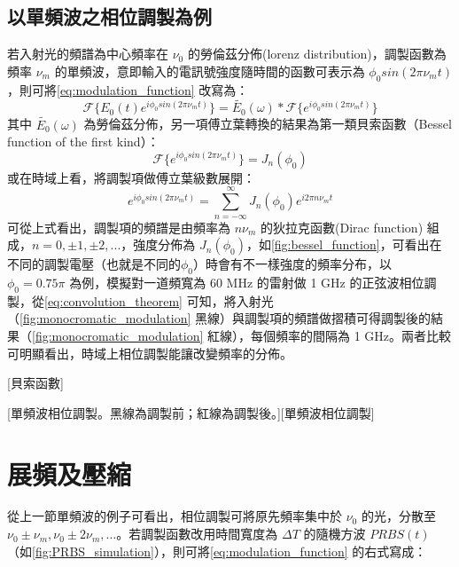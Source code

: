 \documentclass[class=NCU_thesis, crop=false]{standalone}
\begin{document}
\subsection{以單頻波之相位調製為例}
若入射光的頻譜為中心頻率在 $\nu_{0}$ 的勞倫茲分佈(lorenz distribution)，調製函數為頻率 $\nu_{m}$ 的單頻波，意即輸入的電訊號強度隨時間的函數可表示為 $\phi_{0} sin(2\pi \nu_{m} t)$，則可將\cref{eq:modulation_function} 改寫為：
\begin{equation}
\label{eq:convolution_theorem}
    \mathscr{F}\{E_{0}(t)e^{i\phi_{0} sin(2\pi \nu_{m} t)}\}=\tilde{E_{0}}(\omega)*\mathscr{F}\{{e^{i\phi_{0} sin(2\pi \nu_{m} t)}}\}
\end{equation}
其中 $\tilde{E_{0}}(\omega)$ 為勞倫茲分佈，另一項傅立葉轉換的結果為第一類貝索函數（Bessel function of the first kind）：
\begin{equation}
    \mathscr{F}\{{e^{i\phi_{0} sin(2\pi \nu_{m} t)}}\}=J_{n}(\phi_{0})
\end{equation}
或在時域上看，將調製項做傅立葉級數展開：
\begin{equation}
    e^{i\phi_{0} sin(2\pi \nu_{m} t)}=\sum_{n=-\infty}^{\infty}J_{n}(\phi_{0})e^{i 2 \pi n \nu_{m} t}
\end{equation}
可從上式看出，調製項的頻譜是由頻率為 $n \nu_{m}$ 的狄拉克函數(Dirac function) 組成，$n=0, \pm1, \pm2, ...$，強度分佈為 $J_{n}(\phi_{0})$，如\cref{fig:bessel_function}，可看出在不同的調製電壓（也就是不同的$\phi_{0}$）時會有不一樣強度的頻率分布，以 $\phi_{0}=0.75\pi$ 為例，模擬對一道頻寬為 60 MHz 的雷射做 1 GHz 的正弦波相位調製，從\cref{eq:convolution_theorem} 可知，將入射光（\cref{fig:monocromatic_modulation} 黑線）與調製項的頻譜做摺積可得調製後的結果（\cref{fig:monocromatic_modulation} 紅線），每個頻率的間隔為 1 GHz。兩者比較可明顯看出，時域上相位調製能讓改變頻率的分佈。

[貝索函數]

[單頻波相位調製。黑線為調製前；紅線為調製後。][單頻波相位調製]


\section{展頻及壓縮}
\label{section:time_delay}
從上一節單頻波的例子可看出，相位調製可將原先頻率集中於 $\nu_{0}$ 的光，分散至 $\nu_{0}\pm\nu_{m}, \nu_{0}\pm2\nu_{m},\dots$。若調製函數改用時間寬度為 $\Delta T$ 的隨機方波 $PRBS(t)$ （如\cref{fig:PRBS_simulation}），則可將\cref{eq:modulation_function} 的右式寫成：
\end{document}
